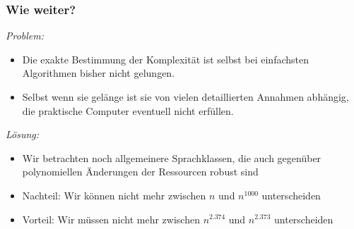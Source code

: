 \documentclass[onlymath]{beamer}
\begin{document}
\begin{frame}\frametitle{Wie weiter?}


\emph{Problem:}
\begin{itemize}
\item Die exakte Bestimmung der Komplexität ist selbst bei einfachsten Algorithmen bisher nicht gelungen.
\item Selbst wenn sie gelänge ist sie von vielen detaillierten Annahmen abhängig, die praktische Computer eventuell nicht erfüllen.
\end{itemize}
\bigskip\pause

\emph{Lösung:}
\begin{itemize}
\item Wir betrachten \alert{noch allgemeinere Sprachklassen}, die auch gegenüber polynomiellen Änderungen der Ressourcen robust sind
\item Nachteil: Wir können nicht mehr zwischen $n$ und $n^{1000}$ unterscheiden
\item Vorteil: Wir müssen nicht mehr zwischen $n^{2.374}$ und $n^{2.373}$ unterscheiden
\end{itemize}

\end{frame}
\end{document}
